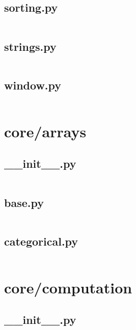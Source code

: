 \documentclass{article}
\begin{document}
\subsection{sorting.py}
\inputminted{python}{/home/dufferzafar/dev/@clones/pandas/pandas/core/sorting.py}
\newpage

\subsection{strings.py}
\inputminted{python}{/home/dufferzafar/dev/@clones/pandas/pandas/core/strings.py}
\newpage

\subsection{window.py}
\inputminted{python}{/home/dufferzafar/dev/@clones/pandas/pandas/core/window.py}
\newpage

\section{core/arrays}

\subsection{\_\_init\_\_.py}
\inputminted{python}{/home/dufferzafar/dev/@clones/pandas/pandas/core/arrays/__init__.py}
\newpage

\subsection{base.py}
\inputminted{python}{/home/dufferzafar/dev/@clones/pandas/pandas/core/arrays/base.py}
\newpage

\subsection{categorical.py}
\inputminted{python}{/home/dufferzafar/dev/@clones/pandas/pandas/core/arrays/categorical.py}
\newpage

\section{core/computation}

\subsection{\_\_init\_\_.py}
\inputminted{python}{/home/dufferzafar/dev/@clones/pandas/pandas/core/computation/__init__.py}
\newpage
\end{document}
